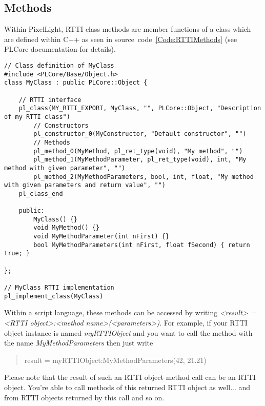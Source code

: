 \subsection{Methods}
Within PixelLight, \ac{RTTI} class methods are member functions of a class which are defined within C++ as seen in source~code~\ref{Code:RTTIMethods} (see PLCore documentation for details).
\begin{lstlisting}[label=Code:RTTIMethods,caption={Definition of \ac{RTTI} class methods with parameters (C++)}]
// Class definition of MyClass
#include <PLCore/Base/Object.h>
class MyClass : public PLCore::Object {

	// RTTI interface
	pl_class(MY_RTTI_EXPORT, MyClass, "", PLCore::Object, "Description of my RTTI class")
		// Constructors
		pl_constructor_0(MyConstructor, "Default constructor", "")
		// Methods
		pl_method_0(MyMethod, pl_ret_type(void), "My method", "")
		pl_method_1(MyMethodParameter, pl_ret_type(void), int, "My method with given parameter", "")
		pl_method_2(MyMethodParameters, bool, int, float, "My method with given parameters and return value", "")
	pl_class_end

	public:
		MyClass() {}
		void MyMethod() {}
		void MyMethodParameter(int nFirst) {}
		bool MyMethodParameters(int nFirst, float fSecond) { return true; }

};

// MyClass RTTI implementation
pl_implement_class(MyClass)
\end{lstlisting}

Within a script language, these methods can be accessed by writing \emph{<result> = <RTTI object>:<method name>(<parameters>)}. For example, if your \ac{RTTI} object instance is named \emph{myRTTIObject} and you want to call the method with the name \emph{MyMethodParameters} then just write \begin{quote}result = myRTTIObject:MyMethodParameters(42, 21.21)\end{quote}

Please note that the result of such an \ac{RTTI} object method call can be an \ac{RTTI} object. You're able to call methods of this returned \ac{RTTI} object as well... and from \ac{RTTI} objects returned by this call and so on.


